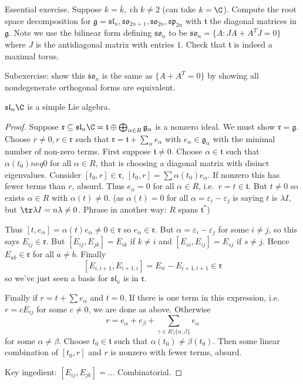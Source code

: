 \documentclass[a4paper]{article}
\newcommand*{\Lie}[1]{\mathfrak{#1}} %
\DeclareMathOperator{\cha}{ch} %
\begin{document}
\begin{ex}
  Essential exercise. Suppose \(k = \overline k, \cha k \neq 2\) (can take \(k = \C\)). Compute the root space decomposition for \(\Lie g = \Lie{sl}_n, \Lie{so}_{2n + 1}, \Lie{so}_{2n}, \Lie{sp}_{2n}\) with \(\Lie t\) the diagonal matrices in \(\Lie g\). Note we use the bilinear form defining \(\Lie{so}_n\) to be \(\Lie{so}_n = \{A: JA + A^TJ = 0\}\) where \(J\) is the antidiagonal matrix with entries \(1\). Check that \(\Lie t\) is indeed a maximal torus.

  Subexercise: show this \(\Lie{so}_n\) is the same as \(\{A + A^T = 0\}\) by showing all nondegenerate orthogonal forms are equivalent.
\end{ex}

\begin{proposition}
  \(\Lie{sl}_n \C\) is a simple Lie algebra.
\end{proposition}

\begin{proof}
  Suppose \(\Lie r \subseteq \Lie{sl}_n \C = \Lie t \oplus \bigoplus_{\alpha \in R} \Lie g_\alpha\) is a nonzero ideal. We must show \(\Lie r = \Lie g\). Choose \(r \neq 0, r \in \Lie r\) such that \(\Lie r = \Lie t + \sum_\alpha e_\alpha\) with \(e_\alpha \in \Lie g_\alpha\) with the minimal number of non-zero terms. First suppose \(\Lie t \neq 0\). Choose \(\alpha \in \Lie t\) such that \(\alpha(t_0) neq 0\) for all \(\alpha \in R\), that is choosing a diagonal matrix with disinct eigenvalues. Consider \([t_0, r] \in \Lie r\), \([t_0, r] = \sum \alpha(t_0) e_\alpha\). If nonzero this has fewer terms than \(r\), absurd. Thus \(e_\alpha = 0\) for all \(\alpha \in R\), i.e.\ \(r = t \in \Lie t\). But \(t \neq 0\) so exists \(\alpha \in R\) with \(\alpha(t) \neq 0\). (as \(\alpha(t) = 0\) for all \(\alpha = \varepsilon_i - \varepsilon_j\) is saying \(t\) is \(\lambda I\), but \(\tr \lambda I = n\lambda \neq 0\). Phrase in another way: \(R\) spans \(\Lie t^*\))

  Thus \([t, e_\alpha] = \alpha(t) e_\alpha \neq 0 \in \Lie r\) so \(e_\alpha \in \Lie r\). But \(\alpha = \varepsilon_i - \varepsilon_j\) for some \(i \neq j\), so this says \(E_{ij} \in \Lie r\). But \([E_{ij}, E_{jk}] = E_{ik}\) if \(k \neq i\) and \([E_{si}, E_{ij}] = E_{sj}\) if \(s \neq j\). Hence \(E_{ab} \in \Lie r\) for all \(a \neq b\). Finally
  \[
    [E_{i, i + 1}, E_{i + 1, i}] = E_{ii} - E_{i + 1, i + 1} \in \Lie r
  \]
  so we've just seen a basis for \(\Lie{sl}_n\) is in \(\Lie r\).

  Finally if \(r = t + \sum e_\alpha\) and \(t = 0\). If there is one term in this expression, i.e.\ \(r = c E_{ij}\) for some \(c \neq 0\), we are done as above. Otherwise
  \[
    r = e_\alpha + e_\beta + \sum_{\gamma \in R\setminus\{\alpha, \beta\}} e_\alpha
  \]
  for some \(\alpha \neq \beta\). Choose \(t_0 \in \Lie t\) such that \(\alpha(t_0) \neq \beta(t_0)\). Then some linear combination of \([t_0, r]\) and \(r\) is nonzero with fewer terms, absurd.

  Key ingedient: \([E_{ij}, E_{jk}] = \dots\) Combinatorial.
\end{proof}
\end{document}
